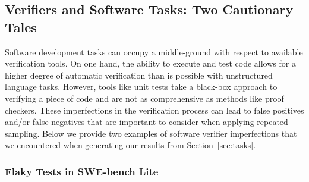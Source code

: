 \documentclass[11pt]{article}
\begin{document}
\label{sec:gsm_grading}
\begin{table}[htbp]
\centering
{}
\caption{Human evaluation of the validity of the Chain-of-Thought reasoning in Llama-3-8B-Instruct answers to GSM8K problems. 3 chains of thought were graded per problem. Even for difficult questions, where the model only gets $\leq 10\%$ of samples correct, the CoTs almost always follow valid logical steps. For the model generations and human labels, \href{https://docs.google.com/spreadsheets/d/1D-suvkheNA4fjLsO2TuwHNqwx2TIECmp}{see here}.}
\label{tab:cot_performance}
\end{table}


\subsection{Verifiers and Software Tasks: Two Cautionary Tales}
\label{sec:cautionary}

Software development tasks can occupy a middle-ground with respect to available verification tools.
On one hand, the ability to execute and test code allows for a higher degree of automatic verification than is possible with unstructured language tasks.
However, tools like unit tests take a black-box approach to verifying a piece of code and are not as comprehensive as methods like proof checkers.
These imperfections in the verification process can lead to false positives and/or false negatives that are important to consider when applying repeated sampling. Below we provide two examples of software verifier imperfections that we encountered when generating our results from Section~\ref{sec:tasks}.  

\subsubsection{Flaky Tests in SWE-bench Lite}
\end{document}
